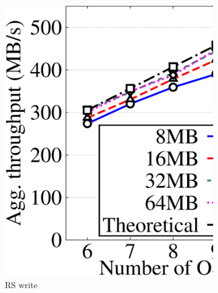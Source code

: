 \begin{figure}[!t]
\begin{subfigure}{0.4\linewidth}
     \includegraphics[width=\linewidth]{charts/transfer/eps/up/rs_6}
     \caption{RS write}
     \label{fig:rs_write}
 \end{subfigure}\\
 \begin{subfigure}{0.4\linewidth}

\end{subfigure}
\end{figure}
